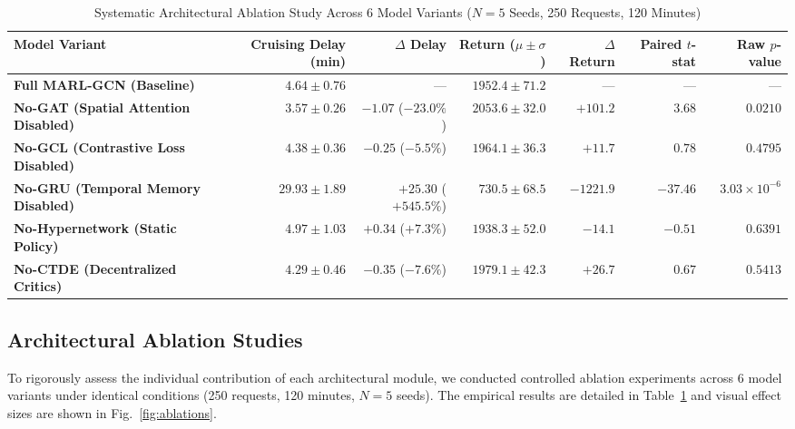 \documentclass[journal]{IEEEtran}
\begin{document}
\begin{table}[t]
\caption{Systematic Architectural Ablation Study Across 6 Model Variants ($N=5$ Seeds, 250 Requests, 120 Minutes)}
\label{tab:ablations}
\centering
\begin{tabular}{lrrrrrr}
\toprule
\textbf{Model Variant} & \textbf{Cruising Delay (min)} & \textbf{$\Delta$ Delay} & \textbf{Return ($\mu \pm \sigma$)} & \textbf{$\Delta$ Return} & \textbf{Paired $t$-stat} & \textbf{Raw $p$-value} \\
\midrule
\textbf{Full MARL-GCN (Baseline)} & $4.64 \pm 0.76$ & --- & $1952.4 \pm 71.2$ & --- & --- & --- \\
\textbf{No-GAT (Spatial Attention Disabled)} & $3.57 \pm 0.26$ & $-1.07$ ($-23.0\%$) & $2053.6 \pm 32.0$ & $+101.2$ & $3.68$ & $0.0210$ \\
\textbf{No-GCL (Contrastive Loss Disabled)} & $4.38 \pm 0.36$ & $-0.25$ ($-5.5\%$) & $1964.1 \pm 36.3$ & $+11.7$ & $0.78$ & $0.4795$ \\
\textbf{No-GRU (Temporal Memory Disabled)} & $29.93 \pm 1.89$ & $+25.30$ ($+545.5\%$) & $730.5 \pm 68.5$ & $-1221.9$ & $-37.46$ & $3.03 \times 10^{-6}$ \\
\textbf{No-Hypernetwork (Static Policy)} & $4.97 \pm 1.03$ & $+0.34$ ($+7.3\%$) & $1938.3 \pm 52.0$ & $-14.1$ & $-0.51$ & $0.6391$ \\
\textbf{No-CTDE (Decentralized Critics)} & $4.29 \pm 0.46$ & $-0.35$ ($-7.6\%$) & $1979.1 \pm 42.3$ & $+26.7$ & $0.67$ & $0.5413$ \\
\bottomrule
\end{tabular}
\end{table}

\subsection{Architectural Ablation Studies}
To rigorously assess the individual contribution of each architectural module, we conducted controlled ablation experiments across 6 model variants under identical conditions (250 requests, 120 minutes, $N=5$ seeds). The empirical results are detailed in Table~\ref{tab:ablations} and visual effect sizes are shown in Fig.~\ref{fig:ablations}.
\end{document}

